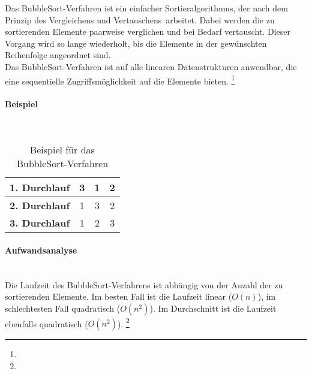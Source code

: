 \documentclass[./entry.tex]{subfiles}
\begin{document}

    Das \dq BubbleSort\dq-Verfahren ist ein einfacher Sortieralgorithmus,
    der nach dem Prinzip des \dq Vergleichens und Vertauschens\dq\ arbeitet.
    Dabei werden die zu sortierenden Elemente paarweise verglichen und bei Bedarf vertauscht.
    Dieser Vorgang wird so lange wiederholt, bis die Elemente in der gewünschten Reihenfolge angeordnet sind.\\
    Das \dq BubbleSort\dq-Verfahren ist auf alle linearen Datenstrukturen anwendbar,
    die eine sequentielle Zugriffsmöglichkeit auf die Elemente bieten.
    \footnote{}

    \paragraph{Beispiel} \mbox{}\\

    \begin{table}[h]
        \centering
        \begin{tabular}{|c|c|c|c|}
            \hline
            \textbf{1. Durchlauf} & 3 & 1 & 2 \\
            \hline
            \textbf{2. Durchlauf} & 1 & 3 & 2 \\
            \hline
            \textbf{3. Durchlauf} & 1 & 2 & 3 \\
            \hline
        \end{tabular}
        \caption{Beispiel für das \dq BubbleSort\dq-Verfahren}
        \label{tab:bubblesort}
    \end{table}

    \paragraph{Aufwandsanalyse} \mbox{}\\
    Die Laufzeit des \dq BubbleSort\dq-Verfahrens ist abhängig von der Anzahl der zu sortierenden Elemente.
    Im besten Fall ist die Laufzeit linear ($O(n)$), im schlechtesten Fall quadratisch ($O(n^2)$).
    Im Durchschnitt ist die Laufzeit ebenfalls quadratisch ($O(n^2)$).
    \footnote{}
\end{document}

